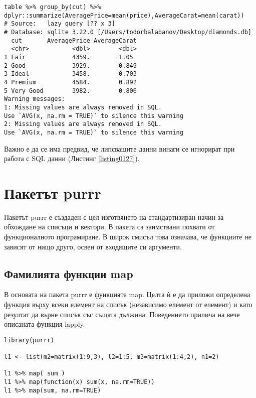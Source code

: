 \begin{lstlisting}[caption=Пресмятания с данни в база данни, label=listing0127]
table %>% group_by(cut) %>% dplyr::summarize(AveragePrice=mean(price),AverageCarat=mean(carat))
# Source:   lazy query [?? x 3]
# Database: sqlite 3.22.0 [/Users/todorbalabanov/Desktop/diamonds.db]
  cut       AveragePrice AverageCarat
  <chr>            <dbl>        <dbl>
1 Fair             4359.        1.05 
2 Good             3929.        0.849
3 Ideal            3458.        0.703
4 Premium          4584.        0.892
5 Very Good        3982.        0.806
Warning messages:
1: Missing values are always removed in SQL.
Use `AVG(x, na.rm = TRUE)` to silence this warning 
2: Missing values are always removed in SQL.
Use `AVG(x, na.rm = TRUE)` to silence this warning
\end{lstlisting}

Важно е да се има предвид, че липсващите данни винаги се игнорират при работа с SQL данни (Листинг \ref{listing0127}).

\section{Пакетът purrr}

Пакетът purrr е създаден с цел изготвянето на стандартизиран начин за обхождане на списъци и вектори. В пакета са заимствани похвати от функционалното програмиране. В широк смисъл това означава, че функциите не зависят от нищо друго, освен от входящите си аргументи.

\subsection{Фамилията функции map}

В основата на пакета purrr е функцията map. Целта ѝ е да приложи определена функция върху всеки елемент на списък (независимо елемент от елемент) и като резултат да върне списък със същата дължина. Поведението прилича на вече описаната функция lapply.

\begin{lstlisting}[caption=Прилагане на функцията map, label=listing0128]
library(purrr)

l1 <- list(m2=matrix(1:9,3), l2=1:5, m3=matrix(1:4,2), n1=2)

l1 %>% map( sum )
l1 %>% map(function(x) sum(x, na.rm=TRUE))
l1 %>% map(sum, na.rm=TRUE)
\end{lstlisting}

